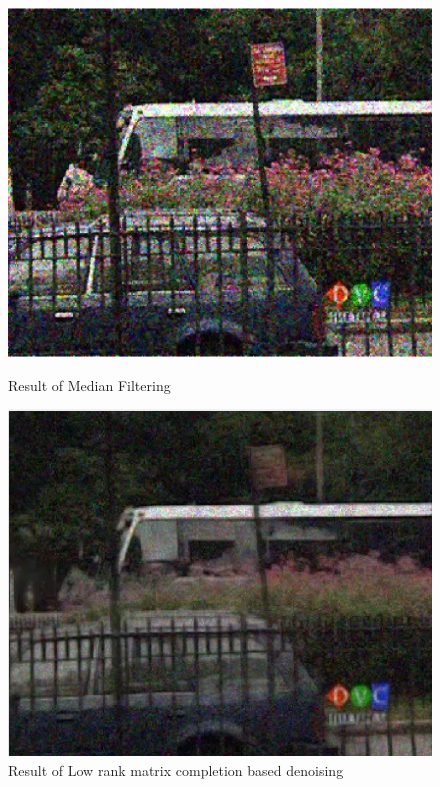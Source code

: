 \documentclass{article}
\begin{document}
\begin{figure}[H]
    \centering
    \begin{minipage}{.45\textwidth}
        \centering
        \includegraphics[width=\linewidth]{Images/Bus_2_median_filter.png}
        \caption{Result of Median Filtering}
    \end{minipage}
    \begin{minipage}{.45\textwidth}
        \centering
        \includegraphics[width=\linewidth]{Images/Bus_2_denoised.png}
        \caption{Result of Low rank matrix completion based denoising}
    \end{minipage}
\end{figure}
\end{document}
